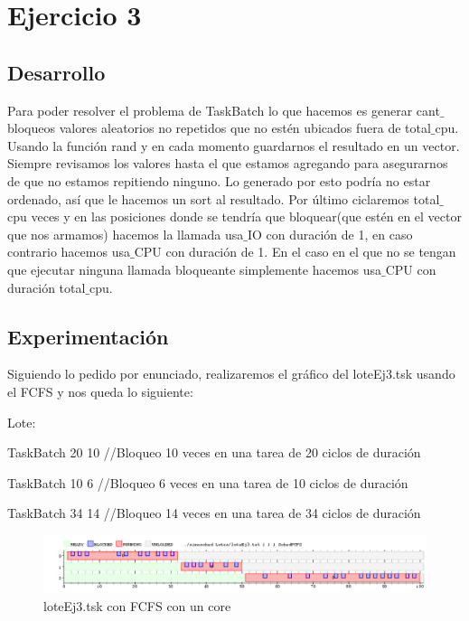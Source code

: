 
\section{Ejercicio 3}

\subsection{Desarrollo}

Para poder resolver el problema de TaskBatch lo que hacemos es generar cant$\_$bloqueos valores aleatorios no repetidos que no estén ubicados fuera de total$\_$cpu. Usando la
función rand y en cada momento guardarnos el resultado en un vector. Siempre revisamos los valores hasta el que estamos agregando para asegurarnos de que no estamos repitiendo
ninguno. Lo generado por esto podría no estar ordenado, así que le hacemos un sort al resultado. Por último ciclaremos total$\_$cpu veces y en las posiciones donde se tendría que 
bloquear(que estén en el vector que nos armamos) hacemos la llamada usa$\_$IO con duración de 1, en caso contrario hacemos usa$\_$CPU con duración de 1. En el caso en el que no 
se tengan que ejecutar ninguna llamada bloqueante simplemente hacemos usa$\_$CPU con duración total$\_$cpu.

\subsection{Experimentación}

Siguiendo lo pedido por enunciado, realizaremos el gráfico del loteEj3.tsk usando el FCFS y nos queda lo siguiente:

Lote:

TaskBatch 20 10  //Bloqueo 10 veces en una tarea de 20 ciclos de duración

TaskBatch 10 6 	//Bloqueo 6 veces en una tarea de 10 ciclos de duración

TaskBatch 34 14 //Bloqueo 14 veces en una tarea de 34 ciclos de duración

\begin{figure}[H]
  \centering
    \includegraphics[width=1.1\textwidth]{imagenes/Ej3Experimento1.png}
  \caption{loteEj3.tsk con FCFS con un core}
\end{figure}

